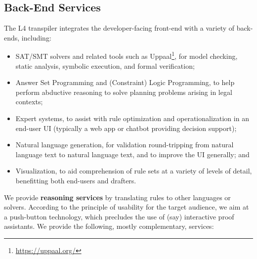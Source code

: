 \documentclass[runningheads]{llncs}
\begin{document}
\subsection{Back-End Services}\label{sec:services}

The L4 transpiler integrates the developer-facing front-end with a variety of back-ends, including:
\begin{itemize}
\item SAT/SMT solvers and related tools such as Uppaal\footnote{\url{https://uppaal.org/}}, for model checking, static analysis, symbolic execution, and formal verification;
\item Answer Set Programming and (Constraint) Logic Programming, to help perform abductive reasoning to solve planning problems arising in legal contexts;
\item Expert systems, to assist with rule optimization and operationalization in an end-user UI (typically a web app or chatbot providing decision support);
\item Natural language generation, for validation round-tripping from natural language text to natural language text, and to improve the UI generally; and
\item Visualization, to aid comprehension of rule sets at a variety of levels of detail, benefitting both end-users and drafters.
\end{itemize}


We provide \textbf{reasoning services} by translating rules to other languages or
solvers. According to the principle of usability for the target audience, we
aim at a push-button technology, which precludes the use of (say) interactive
proof assistants. We provide the following, mostly complementary, services:
\end{document}
